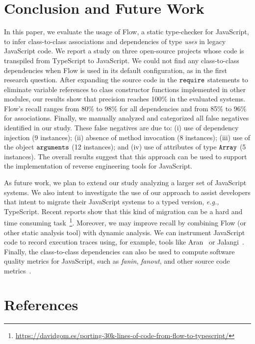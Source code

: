 \documentclass[review]{elsarticle}
\newcommand{\mcode}[1]{$\tt #1$}
\begin{document}
\section{Conclusion and Future Work}
\label{sec:conclusion}

In this paper, we evaluate the usage of Flow, a static type-checker for JavaScript, to infer class-to-class associations and dependencies of type \textit{uses} in legacy JavaScript code. We report a study on three open-source projects whose code is transpiled from TypeScript to JavaScript. We could not find any class-to-class dependencies when Flow is used in its default configuration, as in the first research question. After expanding the source code in the \mcode{require} statements to eliminate variable references to class constructor functions implemented in other modules, our results show that precision reaches 100\% in the evaluated systems. Flow's recall ranges from 80\% to 98\% for all dependencies and from 85\% to 96\% for associations. Finally, we manually analyzed and categorized all false negatives identified in our study. These false negatives are due to: (i) use of dependency injection (9 instances); (ii) absence of method invocation (8 instances); (iii) use of the object \mcode{arguments} (12 instances); and (iv) use of attributes of type \mcode{Array} (5 instances). The overall results suggest that this approach can be used to support the implementation of reverse engineering tools for JavaScript. 

As future work, we plan to extend our study analyzing a larger set of JavaScript systems. We also intent to investigate the use of our approach to assist developers that intent to migrate their JavaScript systems to a typed version, \emph{e.g.,} TypeScript. Recent reports show that this kind of migration can be a hard and time consuming task~\footnote{\url{https://davidgom.es/porting-30k-lines-of-code-from-flow-to-typescript/}}. Moreover, we may improve recall by combining Flow (or other static analysis tool) with dynamic analysis. We can instrument JavaScript code to record execution traces using, for example, tools like Aran~\cite{aran-2015} or Jalangi~\cite{jalangi2013}. Finally, the class-to-class dependencies can also be used to compute software quality metrics for JavaScript, such as \textit{fanin}, \textit{fanout}, and other source code metrics~\cite{CK_metrics}.


\section*{References}


\end{document}
